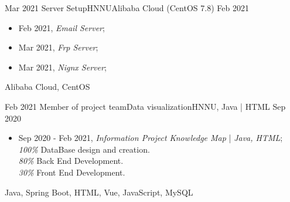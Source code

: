 %
%


 
\begin{experiences}
	

 \experience
  {Mar 2021} {Server Setup}{HNNU}{Alibaba Cloud (CentOS 7.8)}
  {Feb 2021}    {
  	\begin{itemize}
  		\item Feb 2021, \emph{Email Server};
		\item Mar 2021, \emph{Frp Server};
		\item Mar 2021, \emph{Nignx Server};\\
  	\end{itemize}
  }
  {Alibaba Cloud, CentOS}
  		
 \emptySeparator
 \experience
  {Feb 2021} {Member of project team}{Data visualization}{HNNU, Java | HTML}
  {Sep 2020}    {
  	\begin{itemize}
  		\item  Sep 2020 - Feb 2021, \emph{Information Project Knowledge Map} | \emph{Java, HTML};\\
		\emph{100\%} DataBase design and creation.\\
		\emph{80\%} Back End Development.\\
		\emph{30\%} Front End Development.\\
  	\end{itemize}
  }
  {Java, Spring Boot, HTML, Vue, JavaScript, MySQL}
  	

\end{experiences}

